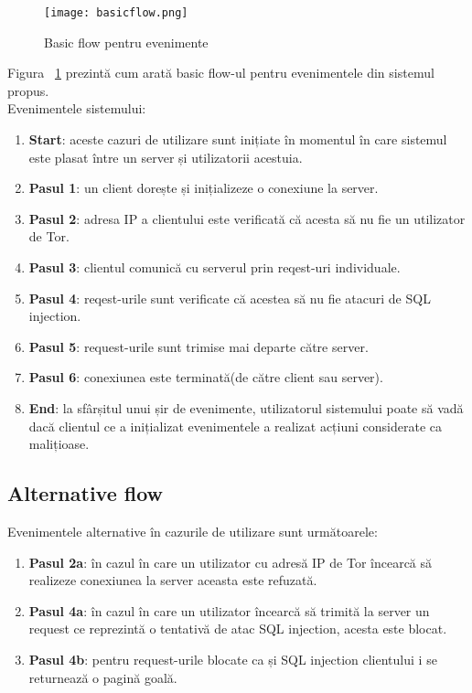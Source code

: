 \begin{figure}[h]
	\centering
	\texttt{[image: basicflow.png]}
	\caption{Basic flow pentru evenimente}
	\label{fig:basic-flow}
\end{figure}
Figura ~\ref{fig:basic-flow}  prezintă cum arată basic flow-ul pentru evenimentele din sistemul propus. \\
\newpage
Evenimentele sistemului:
\begin{enumerate}
	\item \textbf{Start}: aceste cazuri de utilizare sunt inițiate în momentul în care sistemul este plasat între un server și utilizatorii acestuia. 
	\item \textbf{Pasul 1}: un client dorește și inițializeze o conexiune la server. 
	\item \textbf{Pasul 2}: adresa IP a clientului este verificată că acesta să nu fie un utilizator de Tor. 
	\item \textbf{Pasul 3}: clientul comunică cu serverul prin reqest-uri individuale. 
	\item \textbf{Pasul 4}: reqest-urile sunt verificate că acestea să nu fie atacuri de SQL injection. 
	\item \textbf{Pasul 5}: request-urile sunt trimise mai departe către server. 
	\item \textbf{Pasul 6}: conexiunea este terminată(de către client sau server). 
	\item \textbf{End}: la sfârșitul unui șir de evenimente, utilizatorul sistemului poate să vadă dacă clientul ce a inițializat evenimentele a realizat acțiuni considerate ca malițioase. 
	
	
\end{enumerate}


\subsection{Alternative flow}
Evenimentele alternative în cazurile de utilizare sunt următoarele: 
\begin{enumerate}
	\item \textbf{Pasul 2a}: în cazul în care un utilizator cu adresă IP de Tor încearcă să realizeze conexiunea la server aceasta este refuzată.  
	\item \textbf{Pasul 4a}: în cazul în care un utilizator încearcă să trimită la server un request ce reprezintă o tentativă de atac SQL injection, acesta este blocat. 
	\item \textbf{Pasul 4b}: pentru request-urile blocate ca și SQL injection clientului i se returnează o pagină goală. 
\end{enumerate}

